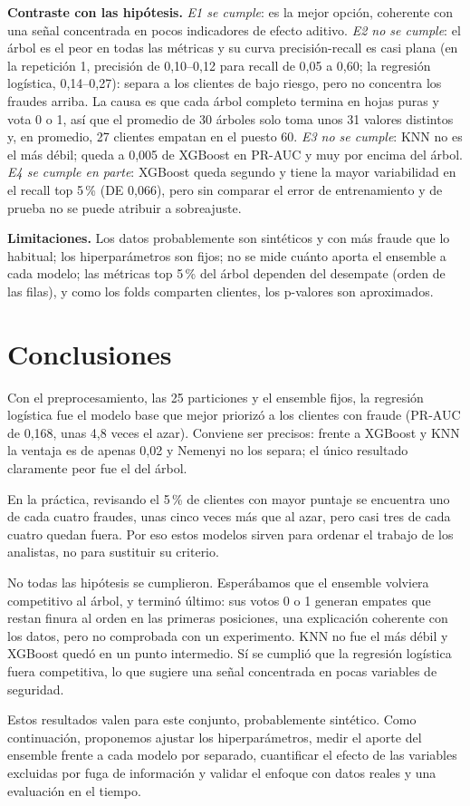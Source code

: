 \documentclass[conference,a4paper]{IEEEtran}
\begin{document}
\textbf{Contraste con las hipótesis.} \emph{E1 se cumple}: es la mejor opción, coherente
con una señal concentrada en pocos indicadores de efecto aditivo. \emph{E2 no se cumple}: el árbol es el peor en todas las métricas y su curva precisión-recall
es casi plana (en la repetición 1, precisión de 0,10--0,12 para recall de 0,05 a 0,60; la regresión logística, 0,14--0,27): separa a los clientes de bajo riesgo, pero no concentra
los fraudes arriba. La causa es que cada árbol completo termina en hojas puras y vota 0 o 1, así
que el promedio de 30 árboles solo toma unos 31 valores distintos y, en promedio, 27 clientes
empatan en el puesto 60.
\emph{E3 no se cumple}: KNN no es el más débil; queda a 0,005 de XGBoost en PR-AUC y muy por
encima del árbol. \emph{E4 se cumple en parte}: XGBoost queda segundo y tiene la mayor
variabilidad en el recall top 5\,\% (DE 0,066), pero sin comparar el error de entrenamiento y
de prueba no se puede atribuir a sobreajuste.

\textbf{Limitaciones.} Los datos probablemente son sintéticos y con más fraude que lo
habitual; los hiperparámetros son fijos; no se mide cuánto aporta el ensemble a cada modelo; las
métricas top 5\,\% del árbol dependen del desempate (orden de las filas), y como los folds
comparten clientes, los p-valores son aproximados.

\section{Conclusiones}

Con el preprocesamiento, las 25 particiones y el ensemble fijos, la regresión logística fue el
modelo base que mejor priorizó a los clientes con fraude (PR-AUC de 0,168, unas 4,8 veces el
azar). Conviene ser precisos: frente a XGBoost y KNN la ventaja es de apenas 0,02 y Nemenyi no
los separa; el único resultado claramente peor fue el del árbol.

En la práctica, revisando el 5\,\% de clientes con mayor puntaje se encuentra uno de cada cuatro
fraudes, unas cinco veces más que al azar, pero casi tres de cada cuatro quedan fuera. Por eso
estos modelos sirven para ordenar el trabajo de los analistas, no para sustituir su criterio.

No todas las hipótesis se cumplieron. Esperábamos que el ensemble volviera competitivo al árbol,
y terminó último: sus votos 0 o 1 generan empates que restan finura al orden en las primeras
posiciones, una explicación coherente con los datos, pero no comprobada con un experimento. KNN
no fue el más débil y XGBoost quedó en un punto intermedio. Sí se cumplió que la regresión
logística fuera competitiva, lo que sugiere una señal concentrada en pocas variables de seguridad.

Estos resultados valen para este conjunto, probablemente sintético. Como continuación, proponemos
ajustar los hiperparámetros, medir el aporte del ensemble frente a cada modelo por separado,
cuantificar el efecto de las variables excluidas por fuga de información y validar el enfoque con
datos reales y una evaluación en el tiempo.



\end{document}
